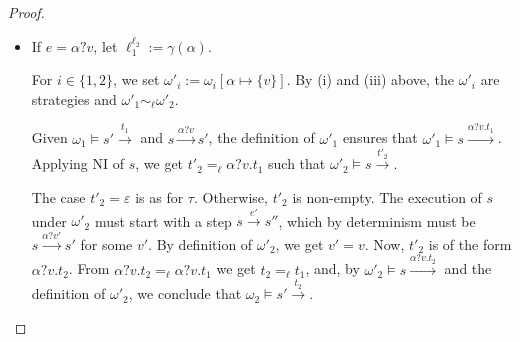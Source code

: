 \documentclass[preprint,5p,twocolumn]{elsarticle}
\begin{document}
\begin{proof}
\begin{itemize}
    For $i \in \{1,2\}$, we set $\omega'_i := \omega_i[\alpha \mapsto \emptyset]$. By (i) and (iii)
    above, the $\omega'_i$ are strategies and $\omega'_1 \sim_\ell \omega'_2$.

    Given $\omega_1 \vDash s' \xrightarrow{t_1}$ and $s \xrightarrow{\alpha!v} s'$, the definition of $\omega'_1$
    ensures that $\omega'_1 \vDash s \xrightarrow{\alpha!v.t_1}$.  
    Applying NI of $s$, we get $t'_2 =_\ell \alpha!v.t_1$ such that $\omega'_2 \vDash s \xrightarrow{t'_2}$.
    
    The case $t'_2 = \varepsilon$ is as for $\tau$. 
    Otherwise, $t'_2$ is non-empty. The execution
    of $s$ under $\omega'_2$ must start with a step $s \xrightarrow{e'} s''$, which by determinism must
    be $s \xrightarrow{\alpha!v} s'$. $t'_2$ is of the form $\alpha ! v.t_2$. From $\alpha!v.t_2 =_\ell \alpha!v.t_1$
    we get $t_2 =_\ell t_1$. By the fact that $\omega'_2 \vDash s \xrightarrow{\alpha!v.t_2}$ and the definition
    of $\omega'_2$, we finally obtain $\omega_2 \vDash s' \xrightarrow{t_2}$.
  \item If $e = \alpha ? v$, let $\ell_1^{\ell_2} := \gamma(\alpha)$.

    For $i \in \{1,2\}$, we set $\omega'_i := \omega_i[\alpha \mapsto \{v\}]$. By (i) and (iii)
    above, the $\omega'_i$ are strategies and $\omega'_1 \sim_\ell \omega'_2$.

    Given $\omega_1 \vDash s' \xrightarrow{t_1}$ and $s \xrightarrow{\alpha?v} s'$, the definition of $\omega'_1$
    ensures that $\omega'_1 \vDash s \xrightarrow{\alpha?v.t_1}$.  
    Applying NI of $s$, we get $t'_2 =_\ell \alpha?v.t_1$ such that $\omega'_2 \vDash s \xrightarrow{t'_2}$.
    
    The case $t'_2 = \varepsilon$ is as for $\tau$. 
    Otherwise, $t'_2$ is non-empty. The execution
    of $s$ under $\omega'_2$ must start with a step $s \xrightarrow{e'} s''$, which by determinism must
    be $s \xrightarrow{\alpha?v'} s'$ for some $v'$. By definition of $\omega'_2$, we get $v'=v$.
    Now, $t'_2$ is of the form $\alpha ? v.t_2$. From $\alpha?v.t_2 =_\ell \alpha?v.t_1$
    we get $t_2 =_\ell t_1$, and, by $\omega'_2 \vDash s \xrightarrow{\alpha?v.t_2}$ and the definition
    of $\omega'_2$, we conclude that $\omega_2 \vDash s' \xrightarrow{t_2}$.
  \end{itemize}
  
\end{proof}
\end{document}
